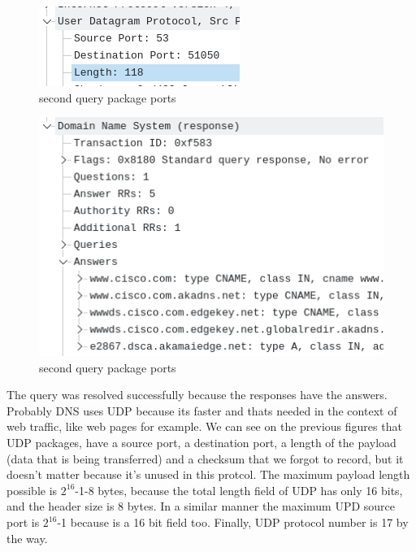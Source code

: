 \begin{figure}[htbp]
	\centering
	\includegraphics[width=1\linewidth]{img/11.png}
	\caption{second query package ports}\label{fig:11}
\end{figure}

\begin{figure}[htbp]
	\centering
	\includegraphics[width=1\linewidth]{img/12.png}
	\caption{second query package ports}\label{fig:12}
\end{figure}

The query was resolved successfully because the responses have the answers.
Probably DNS uses UDP because its faster and thats needed in the context of web
traffic, like web pages for example. We can see on the previous figures that
UDP packages, have a source port, a destination port, a length of the payload
(data that is being transferred) and a checksum that we forgot to record, but
it doesn't matter because it's unused in this protcol. The maximum payload length possible is \(2^{16}\)-1-8 bytes, because the total length field of UDP has only 16 bits, and the header size is 8 bytes. In a similar manner the maximum UPD source port is \(2^{16}\)-1 because is a 16 bit field too. Finally, UDP protocol number is 17 by the way.
